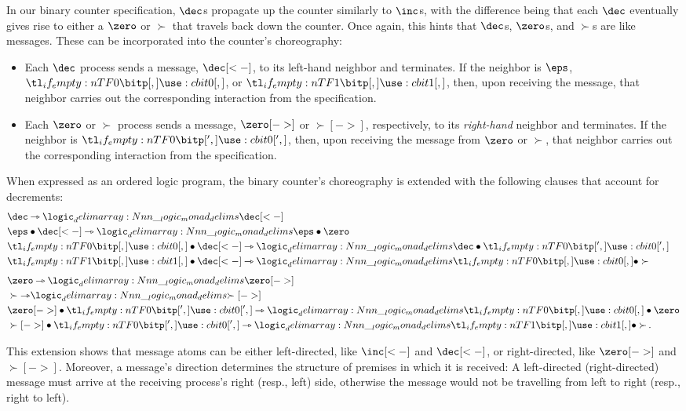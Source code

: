 In our binary counter specification, $\dec$s propagate up the counter similarly to $\inc$s, with the difference being that each $\dec$ eventually gives rise to either a $\zero$ or $\succ$ that travels back down the counter.
Once again, this hints that $\dec$s, $\zero$s, and $\succ$s are like messages.
These can be incorporated into the counter's choreography:
\begin{itemize}
\item Each $\dec$ process sends a message, $\dec[<-]$, to its left-hand neighbor and terminates.
      If the neighbor is $\eps$, $\bit{0}$, or $\bit{1}$, then, upon receiving the message, that neighbor carries out the corresponding interaction from the specification.
\item Each $\zero$ or $\succ$ process sends a message, $\zero[->]$ or $\succ[->]$, respectively, to its \emph{right-hand} neighbor and terminates.
      If the neighbor is $\bit[']{0}$, then, upon receiving the message from $\zero$ or $\succ$, that neighbor carries out the corresponding interaction from the specification.
\end{itemize}
When expressed as an ordered logic program, the binary counter's choreography is extended with the following clauses that account for decrements:
\begin{align*}
  &\dec \lrimp \monad{\dec[<-]} \\
  &\eps \fuse \dec[<-] \lrimp \monad{\eps \fuse \zero} \\
  &\bit{0} \fuse \dec[<-] \lrimp \monad{\dec \fuse \bit[']{0}} \\
  &\bit{1} \fuse \dec[<-] \lrimp \monad{\bit{0} \fuse \succ} \\[1.5\jot]
  &\zero \lrimp \monad{\zero[->]} \\
  &\succ \lrimp \monad{\succ[->]} \\
  &\zero[->] \fuse \bit[']{0} \lrimp \monad{\bit{0} \fuse \zero} \\
  &\succ[->] \fuse \bit[']{0} \lrimp \monad{\bit{1} \fuse \succ}
  \,.
\end{align*}

This extension shows that message atoms can be either left-directed, like $\inc[<-]$ and $\dec[<-]$, or right-directed, like $\zero[->]$ and $\succ[->]$.
Moreover, a message's direction determines the structure of premises in which it is received:
A left-directed (right-directed) message must arrive at the receiving process's right (resp., left) side, otherwise the message would not be travelling from left to right (resp., right to left).


